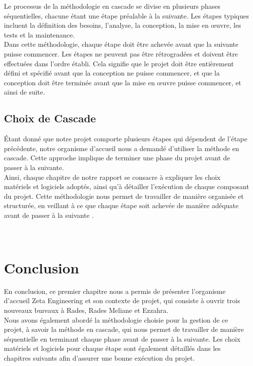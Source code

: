 Le processus de la méthodologie en cascade se divise en plusieurs phases séquentielles, chacune étant une étape préalable à la suivante. Les étapes typiques incluent la définition des besoins, l'analyse, la conception, la mise en œuvre, les tests et la maintenance. \\

Dans cette méthodologie, chaque étape doit être achevée avant que la suivante puisse commencer. Les étapes ne peuvent pas être rétrogradées et doivent être effectuées dans l'ordre établi. Cela signifie que le projet doit être entièrement défini et spécifié avant que la conception ne puisse commencer, et que la conception doit être terminée avant que la mise en œuvre puisse commencer, et ainsi de suite. \\



\subsection{Choix de Cascade}
Étant donné que notre projet comporte plusieurs étapes qui dépendent de l'étape précédente, notre organisme d'accueil nous a demandé d'utiliser la méthode en cascade. Cette approche implique de terminer une phase du projet avant de passer à la suivante.\\ 


Ainsi, chaque chapitre de notre rapport se consacre à expliquer les choix matériels et logiciels adoptés, ainsi qu'à détailler l'exécution de chaque composant du projet. Cette méthodologie nous permet de travailler de manière organisée et structurée, en veillant à ce que chaque étape soit achevée de manière adéquate avant de passer à la suivante \cite{fagarasan2021agile} .\\\\\




\section{Conclusion }
En conclusion, ce premier chapitre nous a permis de présenter l'organisme d'accueil Zeta Engineering et son contexte de projet, qui consiste à ouvrir trois nouveaux bureaux à Rades, Rades Meliane et Ezzahra.\\

Nous avons également abordé la méthodologie choisie pour la gestion de ce projet, à savoir la méthode en cascade, qui nous permet de travailler de manière séquentielle en terminant chaque phase avant de passer à la suivante. Les choix matériels et logiciels pour chaque étape sont également détaillés dans les chapitres suivants afin d'assurer une bonne exécution du projet. \\


